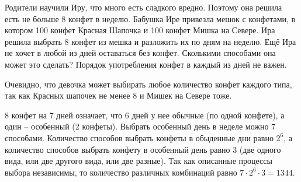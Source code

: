 
Родители научили Иру, что много есть сладкого вредно. Поэтому она решила есть не больше 8 конфет в неделю. Бабушка Ире привезла мешок с конфетами, в котором 100 конфет Красная Шапочка и 100 конфет Мишка на Севере. Ира решила выбрать 8 конфет из мешка и разложить их по дням на неделю. Ещё Ира не хочет в любой из дней оставаться без конфет. Сколькими способами она может это сделать? Порядок употребления конфет в каждый из дней не важен.

\solutionSection

Очевидно, что девочка может выбирать любое количество конфет каждого типа, так как Красных шапочек не менее 8 и Мишек на Севере тоже. 

8 конфет на 7 дней означает, что 6 дней у нее обычные (по одной конфете), а один -- особенный (2 конфеты). Выбрать особенный день в неделе можно $7$ способами. Количество способов выбрать конфеты в обыденные дни равно $2^6$, а количество способов выбрать конфету в особенный день равно $3$ (две одного вида, или две другого вида, или две разные). Так как описанные процессы выбора независимы, то количество различных комбинаций равно $7 \cdot 2^6 \cdot 3 = 1344$.

